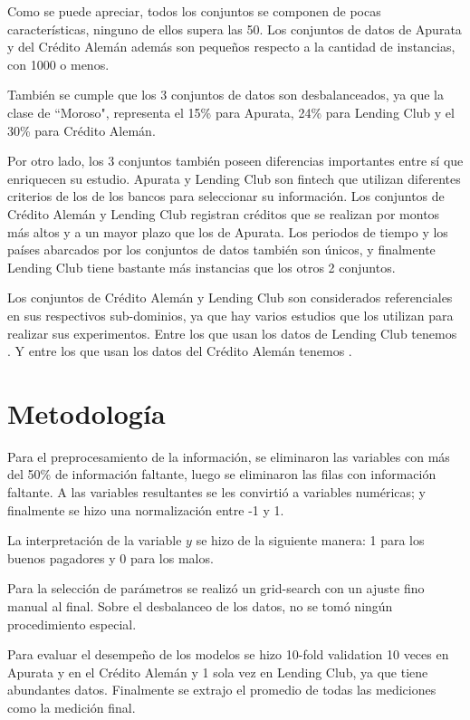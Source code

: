 Como se puede apreciar, todos los conjuntos se componen de pocas características, ninguno de ellos supera las 50. Los conjuntos de datos de Apurata y del Crédito Alemán además son pequeños respecto a la cantidad de instancias, con 1000 o menos.

También se cumple que los 3 conjuntos de datos son desbalanceados, ya que la clase de ``Moroso", representa el 15\% para Apurata, 24\% para Lending Club y el 30\% para Crédito Alemán.

Por otro lado, los 3 conjuntos también poseen diferencias importantes entre sí que enriquecen su estudio. Apurata y Lending Club son fintech que utilizan diferentes criterios de los de los bancos para seleccionar su información. Los conjuntos de Crédito Alemán y Lending Club registran créditos que se realizan por montos más altos y a un mayor plazo que los de Apurata. Los periodos de tiempo y los países abarcados por los conjuntos de datos también son únicos, y finalmente Lending Club tiene bastante más instancias que los otros 2 conjuntos.

Los conjuntos de Crédito Alemán y Lending Club son considerados referenciales en sus respectivos sub-dominios, ya que hay varios estudios que los utilizan para realizar sus experimentos. Entre los que usan los datos de Lending Club tenemos \cite{malekipirbazari2015risk, zhang2016research, zang2014credit, tan2018deep}. Y entre los que usan los datos del Crédito Alemán tenemos \cite{harris2015credit, nanni2009experimental, brown2012experimental, wang2012two}.

\section{Metodología}

Para el preprocesamiento de la información, se eliminaron las variables con más del 50\% de información faltante, luego se eliminaron las filas con información faltante. A las variables resultantes se les convirtió a variables numéricas; y finalmente se hizo una normalización entre -1 y 1.

La interpretación de la variable $y$ se hizo de la siguiente manera: 1 para los buenos pagadores y 0 para los malos.

Para la selección de parámetros se realizó un grid-search con un ajuste fino manual al final. Sobre el desbalanceo de los datos, no se tomó ningún procedimiento especial. 

Para evaluar el desempeño de los modelos se hizo 10-fold validation 10 veces en Apurata y en el Crédito Alemán y 1 sola vez en Lending Club, ya que tiene abundantes datos. Finalmente se extrajo el promedio de todas las mediciones como la medición final. 


